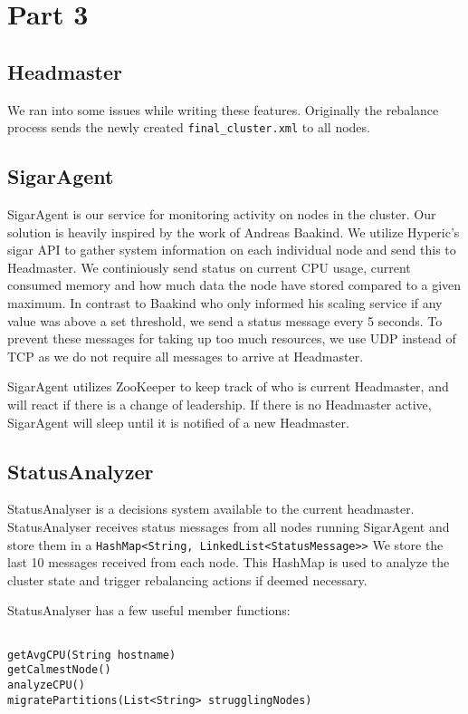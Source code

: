 \section{Part 3}
\subsection{Headmaster}
We ran into some issues while writing these features. Originally the rebalance process sends the newly created \texttt{final\_cluster.xml} to all nodes. 



\subsection{SigarAgent}
SigarAgent is our service for monitoring activity on nodes in the cluster. Our solution is heavily inspired by the work of Andreas Baakind\cite{baakind}. We utilize Hyperic's sigar API to gather system information on each individual node and send this to Headmaster. We continiously send status on current CPU usage, current consumed memory and how much data the node have stored compared to a given maximum. In contrast to Baakind who only informed his scaling service if any value was above a set threshold, we send a status message every 5 seconds. To prevent these messages for taking up too much resources, we use UDP instead of TCP as we do not require all messages to arrive at Headmaster. 

SigarAgent utilizes ZooKeeper to keep track of who is current Headmaster, and will react if there is a change of leadership. If there is no Headmaster active, SigarAgent will sleep until it is notified of a new Headmaster. 

\subsection{StatusAnalyzer}
StatusAnalyser is a decisions system available to the current headmaster. StatusAnalyser receives status messages from all nodes running SigarAgent and store them in a \texttt{HashMap<String, LinkedList<StatusMessage>>} We store the last 10 messages received from each node. This HashMap is used to analyze the cluster state and trigger rebalancing actions if deemed necessary.

StatusAnalyser has a few useful member functions:

\begin{lstlisting}[style=customjava,label=lst:test,caption={a caption}]

getAvgCPU(String hostname)
getCalmestNode()
analyzeCPU()
migratePartitions(List<String> strugglingNodes)

\end{lstlisting}

